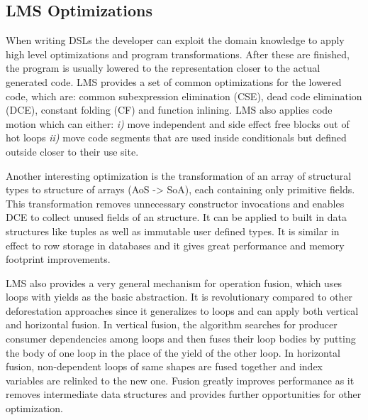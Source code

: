 \subsection{LMS Optimizations}
\label{subsec:lms-optimizations}
When writing DSLs the developer can exploit the domain knowledge to apply high level optimizations and program transformations. After these are finished, the program is usually lowered to the representation closer to the actual generated code. LMS provides a set of common optimizations for the lowered code, which are: common subexpression elimination (CSE), dead code elimination (DCE), constant folding (CF) and function inlining. LMS also applies code motion which can either: \emph{i)} move independent and side effect free blocks out of hot loops \emph{ii)} move code segments that are used inside conditionals but defined outside closer to their use site.   

Another interesting optimization is the transformation of an array of structural types to structure of arrays (AoS -> SoA), each containing only primitive fields. This transformation removes unnecessary constructor invocations and enables DCE to collect unused fields of an structure. It can be applied to built in data structures like tuples as well as immutable user defined types. It is similar in effect to row storage in databases and it gives great performance and memory footprint improvements.

LMS also provides a very general mechanism for operation fusion, which uses loops with yields as the basic abstraction. It is revolutionary compared to other deforestation approaches since it generalizes to loops and can apply both vertical and horizontal fusion. In vertical fusion, the algorithm searches for producer consumer dependencies among loops and then fuses their loop bodies by putting the body of one loop in the place of the yield of the other loop. In horizontal fusion, non-dependent loops of same shapes are fused together and index variables are relinked to the new one. Fusion greatly improves performance as it removes intermediate data structures and provides further opportunities for other optimization.

